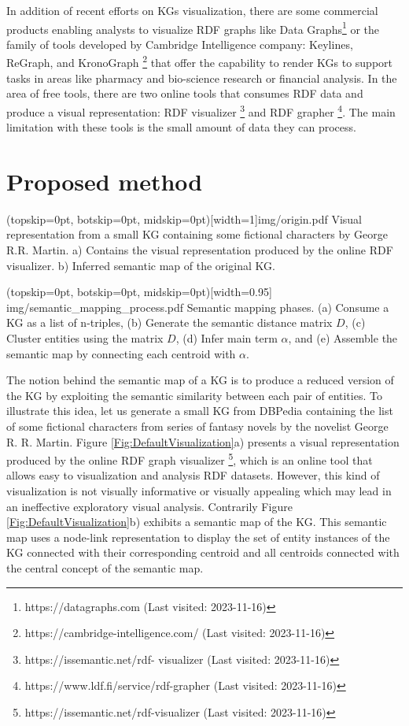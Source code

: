 \documentclass{ieeeaccess}
\begin{document}
In addition of recent efforts on KGs visualization, 
there are some commercial products enabling analysts to 
visualize RDF graphs like Data 
Graphs\footnote{https://datagraphs.com (Last visited: 2023-11-16)} or the 
family of tools developed by Cambridge Intelligence 
company: Keylines, ReGraph, and KronoGraph 
\footnote{https://cambridge-intelligence.com/ (Last visited: 2023-11-16)}
that offer the capability to render KGs to support 
tasks in areas like pharmacy and bio-science research 
or financial analysis. In the area of 
free tools, there are two online tools that consumes 
RDF data and produce a visual representation: RDF 
visualizer \footnote{https://issemantic.net/rdf-
visualizer (Last visited: 2023-11-16)} and RDF grapher 
\footnote{https://www.ldf.fi/service/rdf-grapher (Last visited: 2023-11-16)}. The
main limitation with these tools is the small amount 
of data they can process.
\section{Proposed method}
\label{sec:Method}

\Figure[h!](topskip=0pt, botskip=0pt, midskip=0pt)[width=1\textwidth]{img/origin.pdf}
{Visual representation from a small KG containing some fictional characters by George R.R. Martin. a) Contains the visual representation produced by the online RDF visualizer. b) Inferred semantic map of the original KG.\label{Fig:DefaultVisualization}}

\Figure[h!](topskip=0pt, botskip=0pt, midskip=0pt)[width=0.95\textwidth]
{img/semantic_mapping_process.pdf}
{Semantic mapping phases. 
(a) Consume a KG as a list of n-triples, 
(b) Generate the semantic distance matrix $D$,
(c) Cluster entities using the matrix $D$,
(d) Infer main term $\alpha$, and
(e) Assemble the semantic map by connecting each centroid with $\alpha$.
\label{fig:Semaf}}

The notion behind the semantic map of a KG is 
to produce a reduced version of the KG by 
exploiting the semantic similarity between each
pair of entities. To illustrate this idea, let us 
generate a small KG from DBPedia containing the 
list of some fictional characters from series of
fantasy novels by the novelist George R. R. Martin.
Figure \ref{Fig:DefaultVisualization}a) presents 
a visual representation produced by the online
RDF graph visualizer 
\footnote{https://issemantic.net/rdf-visualizer (Last visited: 2023-11-16)}, 
which is an online tool that allows easy to visualization
and analysis RDF datasets.
However, this kind of visualization is not visually
informative or visually appealing which may lead 
in an ineffective exploratory visual analysis. 
Contrarily Figure \ref{Fig:DefaultVisualization}b)
exhibits a semantic map of the KG. This semantic map uses
a node-link representation to display the set of entity
instances of the KG connected with their corresponding
centroid and all centroids connected with the central
concept of the semantic map.
\end{document}
